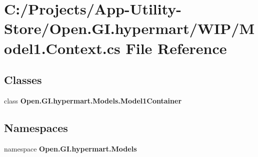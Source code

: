 \section{C\+:/\+Projects/\+App-\/\+Utility-\/\+Store/\+Open.G\+I.\+hypermart/\+W\+I\+P/\+Model1.Context.\+cs File Reference}
\label{_model1_8_context_8cs}
\subsection*{Classes}
\begin{DoxyCompactItemize}
\item 
class \textbf{ Open.\+G\+I.\+hypermart.\+Models.\+Model1\+Container}
\end{DoxyCompactItemize}
\subsection*{Namespaces}
\begin{DoxyCompactItemize}
\item 
namespace \textbf{ Open.\+G\+I.\+hypermart.\+Models}
\end{DoxyCompactItemize}
